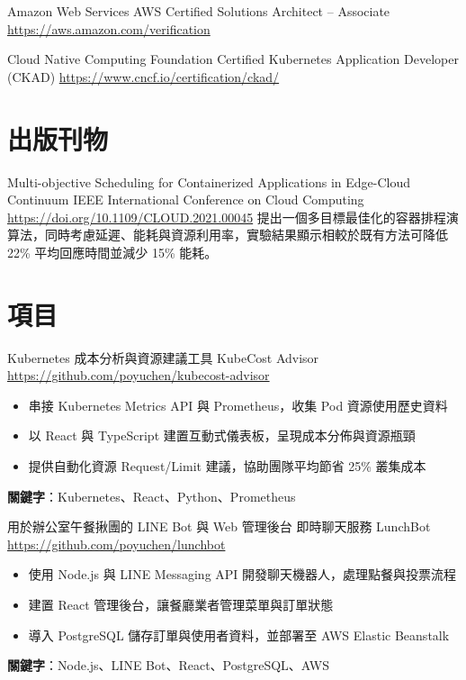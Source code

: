 \documentclass[a4paper, serif, 10pt]{moderncv}
\begin{document}
        {Amazon Web Services}
        {AWS Certified Solutions Architect – Associate}
        {\url{https://aws.amazon.com/verification}}
        {}
        {}

        {Cloud Native Computing Foundation}
        {Certified Kubernetes Application Developer (CKAD)}
        {\url{https://www.cncf.io/certification/ckad/}}
        {}
        {}
\section{出版刊物}

        {Multi-objective Scheduling for Containerized Applications in Edge-Cloud Continuum}
        {IEEE International Conference on Cloud Computing}
        {\url{https://doi.org/10.1109/CLOUD.2021.00045}}
        {}
        {提出一個多目標最佳化的容器排程演算法，同時考慮延遲、能耗與資源利用率，實驗結果顯示相較於既有方法可降低 22\% 平均回應時間並減少 15\% 能耗。}
\section{項目}

        {Kubernetes 成本分析與資源建議工具}
        {KubeCost Advisor}
        {\url{https://github.com/poyuchen/kubecost-advisor}}
        {}
        {\begin{itemize}
\item 串接 Kubernetes Metrics API 與 Prometheus，收集 Pod 資源使用歷史資料
\item 以 React 與 TypeScript 建置互動式儀表板，呈現成本分佈與資源瓶頸
\item 提供自動化資源 Request/Limit 建議，協助團隊平均節省 25\% 叢集成本
\end{itemize}
\textbf{關鍵字}：Kubernetes、React、Python、Prometheus}

        {用於辦公室午餐揪團的 LINE Bot 與 Web 管理後台}
        {即時聊天服務 LunchBot}
        {\url{https://github.com/poyuchen/lunchbot}}
        {}
        {\begin{itemize}
\item 使用 Node.js 與 LINE Messaging API 開發聊天機器人，處理點餐與投票流程
\item 建置 React 管理後台，讓餐廳業者管理菜單與訂單狀態
\item 導入 PostgreSQL 儲存訂單與使用者資料，並部署至 AWS Elastic Beanstalk
\end{itemize}
\textbf{關鍵字}：Node.js、LINE Bot、React、PostgreSQL、AWS}
\end{document}
